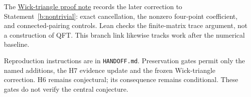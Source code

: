 The \href{https://github.com/nurdymuny/gigi/blob/feat/helike-carrier-geometry-probe/docs/research/h6-wick-triangle-proof-2026-11-27.md}{Wick-triangle proof note}
records the later correction to Statement~\ref{b:nontrivial}: exact cancellation, the nonzero four-point coefficient,
and connected-pairing controls. Lean checks the finite-matrix trace argument, not a construction of QFT.
This branch link likewise tracks work after the numerical baseline.

Reproduction instructions are in \texttt{HANDOFF.md}. Preservation gates permit only the named additions,
the H7 evidence update and the frozen Wick-triangle correction. H6 remains conjectural; its consequence remains
conditional. These gates do not verify the central conjecture.
